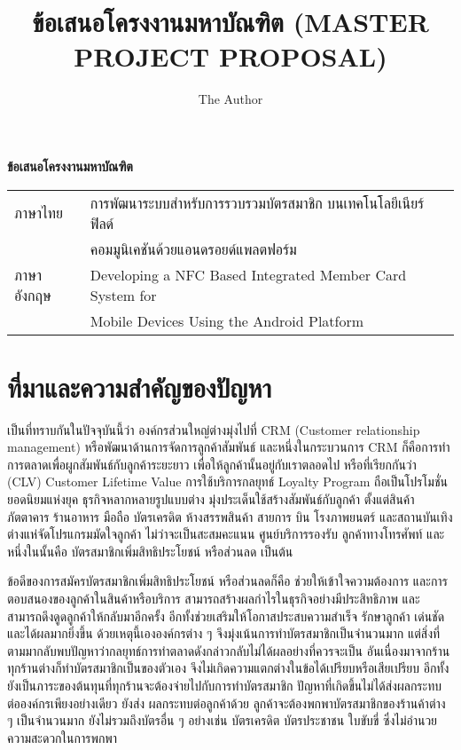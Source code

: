 \documentclass[a4paper]{article}
\title{ข้อเสนอโครงงานมหาบัณฑิต (MASTER PROJECT PROPOSAL)}
\author{The Author}
\newcommand{\MarginText}[1]{\marginpar{\raggedleft\itshape\small#1}} %
\newcommand{\Description}[1]{\hangindent=2em\hangafter=0\noindent\raggedright\footnotesize{#1}\par\normalsize\vspace{1em}}
\begin{document}

\begin{center}
{\huge \bf ข้อเสนอโครงงานมหาบัณฑิต}
\end{center}


\Large{\noindent\hspace{0.7cm}\setlength{\tabcolsep}{15pt}
\begin{tabular}{l l}    
	ภาษาไทย 	& การพัฒนาระบบสำหรับการรวบรวมบัตรสมาชิก บนเทคโนโลยีเนียร์ฟิลด์ \\
				& คอมมูนิเคชันด้วยแอนดรอยด์แพลตฟอร์ม \\
	ภาษาอังกฤษ	& Developing a NFC Based Integrated Member Card System for \\
				& Mobile Devices Using the Android Platform \\    
\end{tabular}
}

\section{ที่มาและความสำคัญของปัญหา}

เป็นที่ทราบกันในปัจจุบันนี้ว่า องค์กรส่วนใหญ่ต่างมุ่งไปที่ CRM (Customer relationship management) หรือพัฒนาด้านการจัดการลูกค้าสัมพันธ์ 
และหนึ่งในกระบวนการ CRM ก็คือการทําการตลาดเพื่อผูกสัมพันธ์กับลูกค้าระยะยาว เพื่อให้ลูกค้านั้นอยู่กับเราตลอดไป หรือที่เรียกกันว่า (CLV) Customer Lifetime Value การใช้บริการกลยุทธ์ Loyalty Program ถือเป็นโปรโมชั่นยอดนิยมแห่งยุค ธุรกิจหลากหลายรูปแบบต่าง
มุ่งประเด็นใช้สร้างสัมพันธ์กับลูกค้า ตั้งแต่สินค้า ภัตตาคาร ร้านอาหาร มือถือ บัตรเครดิต ห้างสรรพสินค้า สายการ
บิน โรงภาพยนตร์ และสถานบันเทิง ต่างแห่จัดโปรแกรมมัดใจลูกค้า ไม่ว่าจะเป็นสะสมคะแนน ศูนย์บริการรองรับ
ลูกค้าทางโทรศัพท์ และหนึ่งในนั้นคือ บัตรสมาชิกเพิ่มสิทธิประโยชน์ หรือส่วนลด เป็นต้น 

ข้อดีของการสมัครบัตรสมาชิกเพิ่มสิทธิประโยชน์ หรือส่วนลดก็คือ ช่วยให้เข้าใจความต้องการ และการตอบสนองของลูกค้าในสินค้าหรือบริการ สามารถสร้างผลกําไรในธุรกิจอย่างมีประสิทธิภาพ และสามารถดึงดูดลูกค้าให้กลับมาอีกครั้ง อีกทั้งช่วยเสริมให้โอกาสประสบความสําเร็จ รักษาลูกค้า เด่นชัด และได้ผลมากยิ่งขึ้น ด้วยเหตุนี้เององค์กรต่าง ๆ จึงมุ่งเน้นการทำบัตรสมาชิกเป็นจำนวนมาก แต่สิ่งที่ตามมากลับพบปัญหาว่ากลยุทธ์การทำตลาดดังกล่าวกลับไม่ได้ผลอย่างที่ควรจะเป็น อันเนื่องมาจากร้านทุกร้านต่างก็ทำบัตรสมาชิกเป็นของตัวเอง จึงไม่เกิดความแตกต่างในข้อได้เปรียบหรือเสียเปรียบ อีกทั้งยังเป็นภาระของต้นทุนที่ทุกร้านจะต้องจ่ายไปกับการทำบัตรสมาชิก ปัญหาที่เกิดขึ้นไม่ได้ส่งผลกระทบต่อองค์กรเพียงอย่างเดียว  ยังส่ง \newline ผลกระทบต่อลูกค้าด้วย ลูกค้าจะต้องพกพาบัตรสมาชิกของร้านค้าต่าง ๆ เป็นจำนวนมาก ยังไม่รวมถึงบัตรอื่น ๆ อย่างเช่น บัตรเครดิต บัตรประชาชน ใบขับขี่ ซึ่งไม่อำนวยความสะดวกในการพกพา
\end{document}

